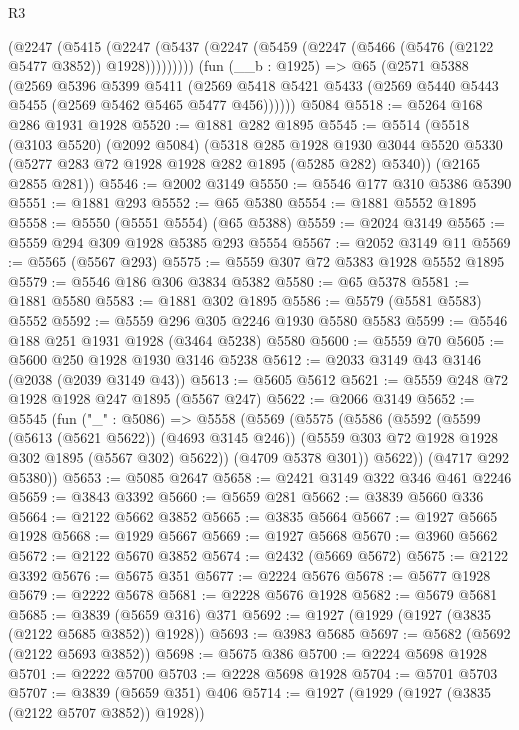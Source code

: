 \begin{lexlean}{R3}
\begin{coremodule}
      (@2247
        (@5415 (@2247 (@5437 (@2247 (@5459 (@2247 (@5466 (@5476 (@2122 @5477 @3852)) @1928)))))))))
    (fun (__b : @1925) =>
    @65
      (@2571
        @5388
        (@2569
          @5396
          @5399
          @5411
          (@2569 @5418 @5421 @5433 (@2569 @5440 @5443 @5455 (@2569 @5462 @5465 @5477 @456))))))
    @5084
@5518 := @5264 @168 @286 @1931 @1928
@5520 := @1881 @282 @1895
@5545 := @5514
    (@5518
      (@3103 @5520)
      (@2092 @5084)
      (@5318
        @285
        @1928
        @1930
        @3044
        @5520
        @5330
        (@5277 @283 @72 @1928 @1928 @282 @1895 (@5285 @282) @5340))
      (@2165 @2855 @281))
@5546 := @2002 @3149
@5550 := @5546 @177 @310 @5386 @5390
@5551 := @1881 @293
@5552 := @65 @5380
@5554 := @1881 @5552 @1895
@5558 := @5550 (@5551 @5554) (@65 @5388)
@5559 := @2024 @3149
@5565 := @5559 @294 @309 @1928 @5385 @293 @5554
@5567 := @2052 @3149 @11
@5569 := @5565 (@5567 @293)
@5575 := @5559 @307 @72 @5383 @1928 @5552 @1895
@5579 := @5546 @186 @306 @3834 @5382
@5580 := @65 @5378
@5581 := @1881 @5580
@5583 := @1881 @302 @1895
@5586 := @5579 (@5581 @5583) @5552
@5592 := @5559 @296 @305 @2246 @1930 @5580 @5583
@5599 := @5546 @188 @251 @1931 @1928 (@3464 @5238) @5580
@5600 := @5559 @70
@5605 := @5600 @250 @1928 @1930 @3146 @5238
@5612 := @2033 @3149 @43 @3146 (@2038 (@2039 @3149 @43))
@5613 := @5605 @5612
@5621 := @5559 @248 @72 @1928 @1928 @247 @1895 (@5567 @247)
@5622 := @2066 @3149
@5652 := @5545
    (fun ("_" : @5086) =>
    @5558
      (@5569
        (@5575
          (@5586
            (@5592
              (@5599 (@5613 (@5621 @5622)) (@4693 @3145 @246))
              (@5559 @303 @72 @1928 @1928 @302 @1895 (@5567 @302) @5622))
            (@4709 @5378 @301))
          @5622))
      (@4717 @292 @5380))
@5653 := @5085 @2647
@5658 := @2421 @3149 @322 @346 @461 @2246
@5659 := @3843 @3392
@5660 := @5659 @281
@5662 := @3839 @5660 @336
@5664 := @2122 @5662 @3852
@5665 := @3835 @5664
@5667 := @1927 @5665 @1928
@5668 := @1929 @5667
@5669 := @1927 @5668
@5670 := @3960 @5662
@5672 := @2122 @5670 @3852
@5674 := @2432 (@5669 @5672)
@5675 := @2122 @3392
@5676 := @5675 @351
@5677 := @2224 @5676
@5678 := @5677 @1928
@5679 := @2222 @5678
@5681 := @2228 @5676 @1928
@5682 := @5679 @5681
@5685 := @3839 (@5659 @316) @371
@5692 := @1927 (@1929 (@1927 (@3835 (@2122 @5685 @3852)) @1928))
@5693 := @3983 @5685
@5697 := @5682 (@5692 (@2122 @5693 @3852))
@5698 := @5675 @386
@5700 := @2224 @5698 @1928
@5701 := @2222 @5700
@5703 := @2228 @5698 @1928
@5704 := @5701 @5703
@5707 := @3839 (@5659 @351) @406
@5714 := @1927 (@1929 (@1927 (@3835 (@2122 @5707 @3852)) @1928))

\end{coremodule}
\end{lexlean}

